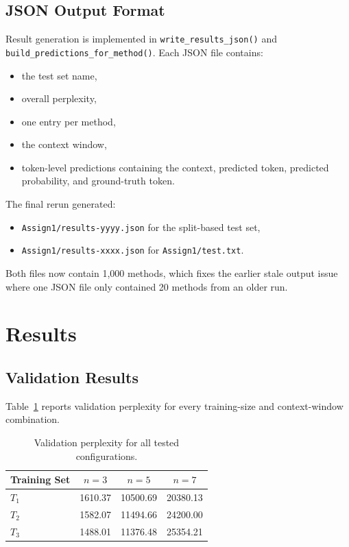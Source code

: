 \documentclass[11pt]{article}
\begin{document}
\subsection{JSON Output Format}
Result generation is implemented in \texttt{write\_results\_json()} and \texttt{build\_predictions\_for\_method()}. Each JSON file contains:
\begin{itemize}[leftmargin=*]
  \item the test set name,
  \item overall perplexity,
  \item one entry per method,
  \item the context window,
  \item token-level predictions containing the context, predicted token, predicted probability, and ground-truth token.
\end{itemize}

The final rerun generated:
\begin{itemize}[leftmargin=*]
  \item \texttt{Assign1/results-yyyy.json} for the split-based test set,
  \item \texttt{Assign1/results-xxxx.json} for \texttt{Assign1/test.txt}.
\end{itemize}

Both files now contain 1,000 methods, which fixes the earlier stale output issue where one JSON file only contained 20 methods from an older run.

\section{Results}

\subsection{Validation Results}
Table~\ref{tab:val-results} reports validation perplexity for every training-size and context-window combination.

\begin{table}[H]
\centering
\begin{tabular}{lccc}
\toprule
Training Set & \(n=3\) & \(n=5\) & \(n=7\) \\
\midrule
\(T_1\) & 1610.37 & 10500.69 & 20380.13 \\
\(T_2\) & 1582.07 & 11494.66 & 24200.00 \\
\(T_3\) & 1488.01 & 11376.48 & 25354.21 \\
\bottomrule
\end{tabular}
\caption{Validation perplexity for all tested configurations.}
\label{tab:val-results}
\end{table}
\end{document}
